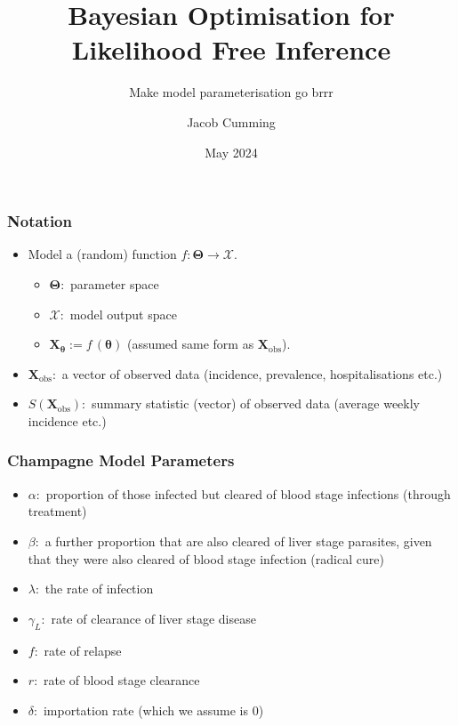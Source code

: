 \documentclass{beamer}
\title[BOLFI]{Bayesian Optimisation for Likelihood Free Inference}
\subtitle{Make model parameterisation go brrr}
\author{Jacob Cumming}
\institute{University of Melbourne, Walter and Eliza Hall Institute}
\date{May 2024}
\begin{document}
\frame{\titlepage}

\begin{frame}
    \frametitle{Notation}
    \begin{itemize}
        \item Model a (random) function $f:\bm{\Theta} \to \bm{\mathcal{X}}.$ 
        \begin{itemize}
            \item $\bm{\Theta}:$ parameter space
            \item $\bm{\mathcal{X}}:$ model output space 
            \item $\mathbf{X}_{\bm{\theta}} := f\,(\bm{\theta})$ (assumed same form as $\mathbf{X}_\text{obs}$).
        \end{itemize}
        \item <2-> $\mathbf{X}_\text{obs}:$ a vector of observed data (incidence, prevalence, hospitalisations etc.)
        \item <3-> $S(\mathbf{X}_\text{obs}):$ summary statistic (vector) of observed data (average weekly incidence etc.)
    \end{itemize}
\end{frame}



\begin{frame}
    \frametitle{Champagne Model Parameters}\begin{itemize}
        \item $\alpha:$ proportion of those infected but cleared of blood stage infections (through treatment)
        \item $\beta:$ a further proportion that are also cleared of liver stage parasites, given that they were also cleared of blood stage infection (radical cure)
        \item $\lambda:$ the rate of infection
        \item $\gamma_L:$ rate of clearance of liver stage disease
        \item $f:$ rate of relapse
        \item $r:$ rate of blood stage clearance
        \item $\delta:$ importation rate (which we assume is 0)
    \end{itemize}

\end{frame}
\end{document}
